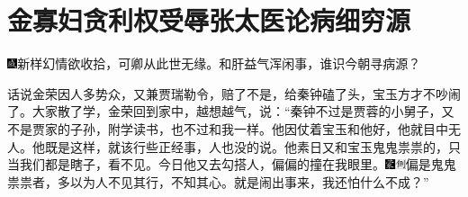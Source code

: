 

\chapter{金寡妇贪利权受辱\hspace{.5em}张太医论病细穷源}

{\includegraphics[width=3mm]{../Images/00005}新样幻情欲收拾，可卿从此世无缘。和肝益气浑闲事，谁识今朝寻病源？}

话说金荣因人多势众，又兼贾瑞勒令，赔了不是，给秦钟磕了头，宝玉方才不吵闹了。大家散了学，金荣回到家中，越想越气，说：``秦钟不过是贾蓉的小舅子，又不是贾家的子孙，附学读书，也不过和我一样。他因仗着宝玉和他好，他就目中无人。他既是这样，就该行些正经事，人也没的说。他素日又和宝玉鬼鬼祟祟的，只当我们都是瞎子，看不见。今日他又去勾搭人，偏偏的撞在我眼里。{\includegraphics[width=3mm]{../Images/00006}\includegraphics[width=3mm]{../Images/00011}\footnotesize \kaishu 偏是鬼鬼祟祟者，多以为人不见其行，不知其心。}就是闹出事来，我还怕什么不成？''


